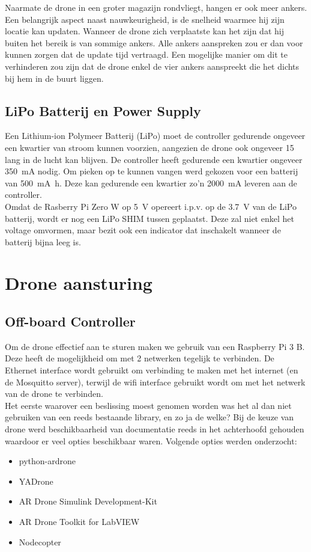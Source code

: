 Naarmate de drone in een groter magazijn rondvliegt, hangen er ook meer ankers.
Een belangrijk aspect naast nauwkeurigheid, is de snelheid waarmee hij zijn locatie kan updaten.
Wanneer de drone zich verplaatste kan het zijn dat hij buiten het bereik is van sommige ankers.
Alle ankers aanspreken zou er dan voor kunnen zorgen dat de update tijd vertraagd.
Een mogelijke manier om dit te verhinderen zou zijn dat de drone enkel de vier ankers aanspreekt die het dichts bij hem in de buurt liggen.

\subsection{LiPo Batterij en Power Supply} \label{sec:lipo}
Een Lithium-ion Polymeer Batterij (LiPo) moet de controller gedurende ongeveer een kwartier van stroom kunnen voorzien, aangezien de drone ook ongeveer \SI{15}{\min} lang in de lucht kan blijven.
De controller heeft gedurende een kwartier ongeveer \SI{350}{\mA} nodig.
Om pieken op te kunnen vangen werd gekozen voor een batterij van \SI{500}{\mA\hour}. Deze kan gedurende een kwartier zo'n \SI{2000}{\mA} leveren aan de controller.\\

Omdat de Rasberry Pi Zero W op \SI{5}{\V} opereert i.p.v. op de \SI{3.7}{\V} van de LiPo batterij, wordt er nog een LiPo SHIM tussen geplaatst.
Deze zal niet enkel het voltage omvormen, maar bezit ook een indicator dat inschakelt wanneer de batterij bijna leeg is.

\section{Drone aansturing} \label{sec:drone_control}
\subsection{Off-board Controller} \label{sec:offboard_controller}
Om de drone effectief aan te sturen maken we gebruik van een Raspberry Pi 3 B.
Deze heeft de mogelijkheid om met 2 netwerken tegelijk te verbinden.
De Ethernet interface wordt gebruikt om verbinding te maken met het internet (en de Mosquitto server), terwijl de wifi interface gebruikt wordt om met het netwerk van de drone te verbinden.\\

Het eerste waarover een beslissing moest genomen worden was het al dan niet gebruiken van een reeds bestaande library, en zo ja de welke?
Bij de keuze van drone werd beschikbaarheid van documentatie reeds in het achterhoofd gehouden waardoor er veel opties beschikbaar waren.
Volgende opties werden onderzocht:
\begin{itemize}
\item python-ardrone
\item YADrone
\item AR Drone Simulink Development-Kit
\item AR Drone Toolkit for LabVIEW
\item Nodecopter
\end{itemize}

